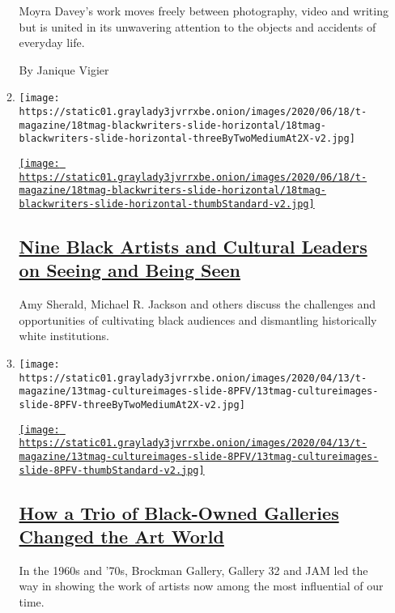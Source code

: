 \begin{enumerate}
\begin{enumerate}
    Moyra Davey's work moves freely between photography, video and
    writing but is united in its unwavering attention to the objects and
    accidents of everyday life.

    By Janique Vigier
  \item
    \texttt{[image: https://static01.graylady3jvrrxbe.onion/images/2020/06/18/t-magazine/18tmag-blackwriters-slide-horizontal/18tmag-blackwriters-slide-horizontal-threeByTwoMediumAt2X-v2.jpg]}

    \href{/2020/06/23/t-magazine/black-artists-white-gaze.html}{\texttt{[image: https://static01.graylady3jvrrxbe.onion/images/2020/06/18/t-magazine/18tmag-blackwriters-slide-horizontal/18tmag-blackwriters-slide-horizontal-thumbStandard-v2.jpg]}}

    \hypertarget{nine-black-artists-and-cultural-leaders-on-seeing-and-being-seen}{%
    \subsection{\texorpdfstring{\href{/2020/06/23/t-magazine/black-artists-white-gaze.html}{Nine
    Black Artists and Cultural Leaders on Seeing and Being
    Seen}}{Nine Black Artists and Cultural Leaders on Seeing and Being Seen}}\label{nine-black-artists-and-cultural-leaders-on-seeing-and-being-seen}}

    Amy Sherald, Michael R. Jackson and others discuss the challenges
    and opportunities of cultivating black audiences and dismantling
    historically white institutions.
  \item
    \texttt{[image: https://static01.graylady3jvrrxbe.onion/images/2020/04/13/t-magazine/13tmag-cultureimages-slide-8PFV/13tmag-cultureimages-slide-8PFV-threeByTwoMediumAt2X-v2.jpg]}

    \href{/interactive/2020/04/13/t-magazine/black-art-galleries.html}{\texttt{[image: https://static01.graylady3jvrrxbe.onion/images/2020/04/13/t-magazine/13tmag-cultureimages-slide-8PFV/13tmag-cultureimages-slide-8PFV-thumbStandard-v2.jpg]}}

    \hypertarget{how-a-trio-of-black-owned-galleries-changed-the-art-world}{%
    \subsection{\texorpdfstring{\href{/interactive/2020/04/13/t-magazine/black-art-galleries.html}{How
    a Trio of Black-Owned Galleries Changed the Art
    World}}{How a Trio of Black-Owned Galleries Changed the Art World}}\label{how-a-trio-of-black-owned-galleries-changed-the-art-world}}

    In the 1960s and '70s, Brockman Gallery, Gallery 32 and JAM led the
    way in showing the work of artists now among the most influential of
    our time.
  \end{enumerate}
\end{enumerate}

